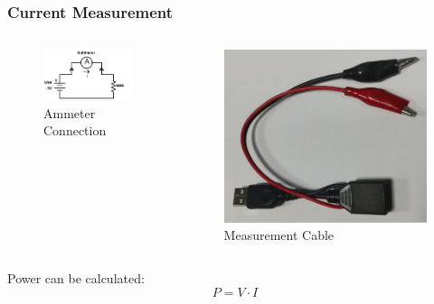 \documentclass[aspectratio=169,usenames,dvipsnames]{beamer}
\begin{document}
\begin{frame}
  \frametitle{Current Measurement}
  \vspace*{-2mm}
  \begin{columns}
    \begin{figure}
      \centering
      \includegraphics[scale=0.8]{images/ammeter.pdf}
      \caption{Ammeter Connection}
    \end{figure}
    \begin{figure}
      \centering
      \includegraphics[scale=0.07]{images/current-cable.jpg}
      \caption{Measurement Cable}
    \end{figure}
  \end{columns}

  Power can be calculated:
  \[ P = V \cdot I \]
\end{frame}
\end{document}
